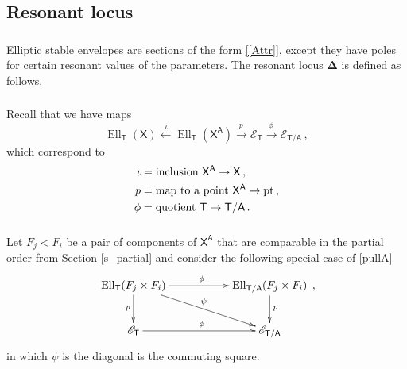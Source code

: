 \documentclass[14pt]{extarticle}
\newcommand{\bT}{\mathsf{T}}
\newcommand{\bA}{\mathsf{A}}
\newcommand{\bX}{\mathsf{X}}
\newcommand{\cE}{\mathscr{E}}
\newcommand{\bDel}{\boldsymbol{\Delta}}
\newcommand{\vth}{\vartheta}
\DeclareMathOperator{\Ell}{Ell}
\DeclareMathOperator{\pt}{pt}
\theoremstyle{definition}
\begin{document}





\subsection{Resonant locus}
\label{sec:resonant-locus}

\subsubsection{}

Elliptic stable envelopes are sections of the form \eqref{[Attr]},
except they have poles for certain resonant values of the
parameters. The resonant locus $\bDel$ is defined as follows. 


\subsubsection{} 

Recall that we have maps 
%
\begin{equation}
\Ell_\bT(\bX) \xleftarrow{\,\,\, \iota \,\, }
\Ell_\bT(\bX^\bA) 
\xrightarrow{\,\, p  \,\,\, }\cE_\bT \xrightarrow{\,\, \phi  \,\,\, }
\cE_{\bT/\bA}
\,,\label{ipphi}
\end{equation}
%
which correspond to
%
\begin{align*}
  \label{eq:9}
  \iota &= \textup{inclusion $\bX^\bA \to \bX$}\,,\\
  p &= \textup{map to a point $\bX^\bA \to \pt$}\,,\\
  \phi &= \textup{quotient $\bT \to \bT/\bA$} \,. 
\end{align*}
%

\subsubsection{}
Let $F_j < F_i$ be a pair of components of $\bX^\bA$ that are comparable in the
partial order from Section \ref{s_partial}
and consider the following special case of \eqref{pullA}
%
\begin{equation}
  \label{pullA2}
  \xymatrix{
    \Ell_\bT(F_j \times F_i) \ar[rr]^{\phi} \ar[rrd]^\psi 
    \ar[d]_{p} && \Ell_{\bT/\bA}(F_j \times F_i)
    \ar[d]^{p} \\
    \cE_\bT \ar[rr]^{\phi} && \cE_{\bT/\bA}
    }\,, 
  \end{equation}
  in which $\psi$ is the diagonal is the commuting square. 
\end{document}
